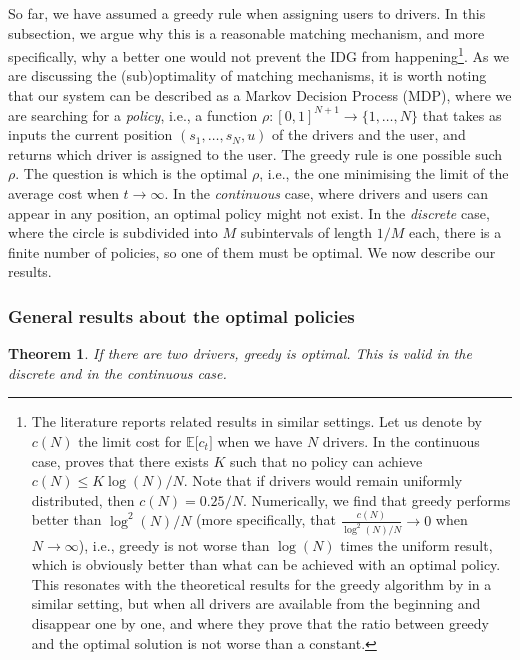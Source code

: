 \documentclass[12pt,english]{article}
\newtheorem{theorem}{Theorem}
\begin{document}
{So far, we have assumed a greedy rule when assigning users to drivers. In this subsection, we argue why this is a reasonable matching mechanism, and more specifically, why a better one would not prevent the IDG from happening\footnote{The literature reports related results in similar settings. Let us denote by $c(N)$ the limit cost for $\mathbb{E}\big[c_t\big]$ when we have $N$ drivers. In the continuous case, \cite{kanoria2021dynamic} proves that there exists $K$ such that no policy can achieve $c(N) \leq K \log(N)/N$. Note that if drivers would remain uniformly distributed, then $c(N) = 0.25/N$. Numerically, we find that greedy performs better than $\log^2(N)/N$ (more specifically, that $\frac{c(N)}{\log^2(N)/N} \rightarrow 0$ when $N\rightarrow \infty$), i.e., greedy is not worse than $\log(N)$ times the uniform result, which is obviously better than what can be achieved with an optimal policy. This resonates with the theoretical results for the greedy algorithm by \cite{balkanski2023power} in a similar setting, but when all drivers are available from the beginning and disappear one by one, and where they prove that the ratio between greedy and the optimal solution is not worse than a constant.}. As we are discussing the (sub)optimality of matching mechanisms, it is worth noting that our system can be described as a Markov Decision Process (MDP), where we are searching for a \textit{policy}, i.e., a function $\rho:[0,1]^{N+1} \rightarrow \{1,\ldots,N\}$ that takes as inputs the current position $(s_1,\ldots,s_N,u)$ of the drivers and the user, and returns which driver is assigned to the user. The greedy rule is one possible such $\rho$. The question is which is the optimal $\rho$, i.e., the one minimising the limit of the average cost when $t\rightarrow \infty$. In the \textit{continuous} case, where drivers and users can appear in any position, an optimal policy might not exist. In the \textit{discrete} case, where the circle is subdivided into $M$ subintervals of length $1/M$ each, there is a finite number of policies, so one of them must be optimal. We now describe our results.

\subsubsection{General results about the optimal policies}
\begin{theorem}
    If there are two drivers, greedy is optimal. This is valid in the discrete and in the continuous case.
\end{theorem}

}
\end{document}
